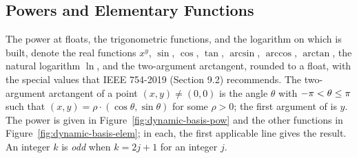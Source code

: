 \subsection{Powers and Elementary Functions}\label{sec:appendix-dynamic-basis-elementary}

The power at floats, the trigonometric functions, and the logarithm
 on which  is built, denote the real
functions $x^{y}$, $\sin$, $\cos$, $\tan$, $\arcsin$, $\arccos$, $\arctan$,
the natural logarithm $\ln$, and the two-argument arctangent, rounded to a
float, with the special values that IEEE 754-2019 (Section 9.2) recommends.
The two-argument arctangent of a point $(x,y)\neq(0,0)$ is the angle
$\theta$ with $-\pi<\theta\leq\pi$ such that
$(x,y)=\rho\cdot(\cos\theta,\sin\theta)$ for some $\rho>0$; the first argument
of  is $y$. The power is given in
Figure~\ref{fig:dynamic-basis-pow} and the other functions in
Figure~\ref{fig:dynamic-basis-elem}; in each, the first applicable line gives
the result. An integer $k$ is \emph{odd} when $k=2j+1$ for an integer $j$.

